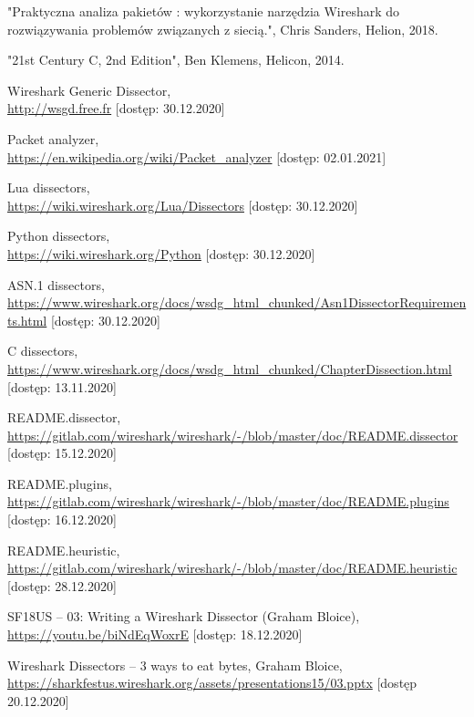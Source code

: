 \documentclass[a4paper, 11pt, twoside, openright]{article}
\begin{document}
\cleardoublepage

\begin{thebibliography}{99}

		"Praktyczna analiza pakietów : wykorzystanie narzędzia Wireshark do rozwiązywania problemów związanych z siecią.", Chris Sanders, Helion, 2018.

		"21st Century C, 2nd Edition", Ben Klemens, Helicon, 2014.

		Wireshark Generic Dissector, \\
		\url{http://wsgd.free.fr} [dostęp: 30.12.2020]

		Packet analyzer, \\
		\url{https://en.wikipedia.org/wiki/Packet\_analyzer} [dostęp: 02.01.2021]

		Lua dissectors, \\
		\url{https://wiki.wireshark.org/Lua/Dissectors} [dostęp: 30.12.2020]

		Python dissectors, \\
		\url{https://wiki.wireshark.org/Python} [dostęp: 30.12.2020]

		ASN.1 dissectors, \\
		\url{https://www.wireshark.org/docs/wsdg\_html\_chunked/Asn1DissectorRequirements.html} [dostęp: 30.12.2020]

		C dissectors, \\
		\url{https://www.wireshark.org/docs/wsdg\_html\_chunked/ChapterDissection.html} [dostęp: 13.11.2020]

		README.dissector, \\
		\url{https://gitlab.com/wireshark/wireshark/-/blob/master/doc/README.dissector} [dostęp: 15.12.2020]

		README.plugins, \\
		\url{https://gitlab.com/wireshark/wireshark/-/blob/master/doc/README.plugins} [dostęp: 16.12.2020]

		README.heuristic, \\
		\url{https://gitlab.com/wireshark/wireshark/-/blob/master/doc/README.heuristic} [dostęp: 28.12.2020]

		SF18US -- 03: Writing a Wireshark Dissector (Graham Bloice), \\
		\url{https://youtu.be/biNdEqWoxrE} [dostęp: 18.12.2020]

		Wireshark Dissectors -- 3 ways to eat bytes, Graham Bloice, \\
		\url{https://sharkfestus.wireshark.org/assets/presentations15/03.pptx} [dostęp 20.12.2020]



\end{thebibliography}
\end{document}
